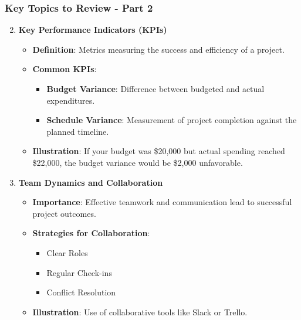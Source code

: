 \documentclass[aspectratio=169]{beamer}
\begin{document}
\begin{frame}[fragile]
    \frametitle{Key Topics to Review - Part 2}
    \begin{enumerate}
        \setcounter{enumi}{1} %
        \item \textbf{Key Performance Indicators (KPIs)}
            \begin{itemize}
                \item \textbf{Definition}: Metrics measuring the success and efficiency of a project.
                \item \textbf{Common KPIs}:
                    \begin{itemize}
                        \item \textbf{Budget Variance}: Difference between budgeted and actual expenditures.
                        \item \textbf{Schedule Variance}: Measurement of project completion against the planned timeline.
                    \end{itemize}
                \item \textbf{Illustration}: If your budget was \$20,000 but actual spending reached \$22,000, the budget variance would be \$2,000 unfavorable.
            \end{itemize}
        
        \item \textbf{Team Dynamics and Collaboration}
            \begin{itemize}
                \item \textbf{Importance}: Effective teamwork and communication lead to successful project outcomes.
                \item \textbf{Strategies for Collaboration}:
                    \begin{itemize}
                        \item Clear Roles
                        \item Regular Check-ins
                        \item Conflict Resolution
                    \end{itemize}
                \item \textbf{Illustration}: Use of collaborative tools like Slack or Trello.
            \end{itemize}
    \end{enumerate}
\end{frame}
\end{document}
